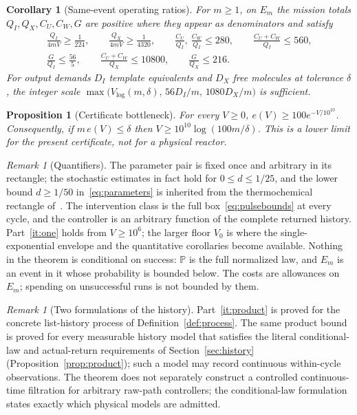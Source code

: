 \documentclass[11pt,a4paper]{article}
\theoremstyle{plain}
\newtheorem{proposition}[theorem]{Proposition}
\newtheorem{corollary}[theorem]{Corollary}
\theoremstyle{definition}
\theoremstyle{remark}
\newtheorem{remark}[theorem]{Remark}
\newcommand{\Prob}{\mathbb P}
\begin{document}
\begin{corollary}[Same-event operating ratios]\label{cor:ratios}
For $m\ge1$, on $E_m$ the mission totals $Q_I,Q_X,C_U,C_W,G$ are positive where they appear as denominators and satisfy
\begin{gather*}
\frac{Q_I}{4mV}\ge\frac1{224},\qquad \frac{Q_X}{4mV}\ge\frac1{4320},\qquad \frac{C_U}{Q_I},\ \frac{C_W}{Q_I}\le280,\qquad \frac{C_U+C_W}{Q_I}\le560,\\
\frac G{Q_I}\le\frac{56}5,\qquad \frac{C_U+C_W}{Q_X}\le10800,\qquad \frac G{Q_X}\le216.
\end{gather*}
For output demands $D_I$ template equivalents and $D_X$ free molecules at tolerance $\delta$, the integer scale $\max\bigl(V_{\log}(m,\delta),\,56D_I/m,\,1080D_X/m\bigr)$ is sufficient.
\end{corollary}

\begin{proposition}[Certificate bottleneck]\label{prop:bottleneck}
For every $V\ge0$, $e(V)\ge100e^{-V/10^{10}}$. Consequently, if $m\,e(V)\le\delta$ then $V\ge10^{10}\log(100m/\delta)$. This is a lower limit for the present certificate, not for a physical reactor.
\end{proposition}

\begin{remark}[Quantifiers]\label{rem:quantifiers}
The parameter pair is fixed once and arbitrary in its rectangle; the stochastic estimates in fact hold for $0\le d\le1/25$, and the lower bound $d\ge1/50$ in~\eqref{eq:parameters} is inherited from the thermochemical rectangle of~\citep{thermo2026}. The intervention class is the full box~\eqref{eq:pulsebounds} at every cycle, and the controller is an arbitrary function of the complete returned history. Part~\ref{it:one} holds from $V\ge10^6$; the larger floor $V_0$ is where the single-exponential envelope and the quantitative corollaries become available. Nothing in the theorem is conditional on success: $\Prob$ is the full normalized law, and $E_m$ is an event in it whose probability is bounded below. The costs are allowances on $E_m$; spending on unsuccessful runs is not bounded by them.
\end{remark}

\begin{remark}[Two formulations of the history]\label{rem:history}
Part~\ref{it:product} is proved for the concrete list-history process of Definition~\ref{def:process}. The same product bound is proved for every measurable history model that satisfies the literal conditional-law and actual-return requirements of Section~\ref{sec:history} (Proposition~\ref{prop:product}); such a model may record continuous within-cycle observations. The theorem does not separately construct a controlled continuous-time filtration for arbitrary raw-path controllers; the conditional-law formulation states exactly which physical models are admitted.
\end{remark}
\end{document}
